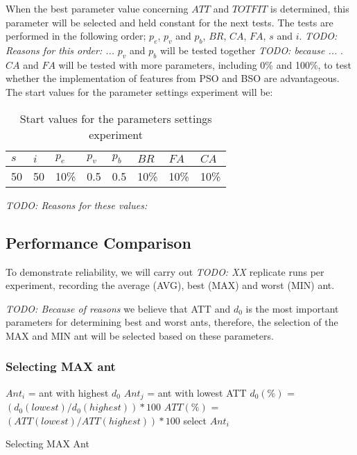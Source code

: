 When the best parameter value concerning $ATT$ and $TOTFIT$ is determined, this parameter will be selected and held constant for the next tests. The tests are performed in the following order; $p_{e}$, $p_{v}$ and $p_{b}$, $BR$, $CA$, $FA$, $s$ and $i$. \emph{\color{blue} TODO: Reasons for this order: ... }
$p_{v}$ and $p_{b}$ will be tested together \emph{\color{blue} TODO: because ... }.
$CA$ and $FA$ will be tested with more parameters, including 0\% and 100\%, to test whether the implementation of features from PSO and BSO are advantageous. The start values for the parameter settings experiment will be:

\begin{table}[H]
	\centering
    \begin{tabular}{|l|l|l|l|l|l|l|l|}
 	\hline
 	$s$ & $i$ & $p_{e}$ & $p_{v}$ & $p_{b}$ & $BR$  & $FA$ & $CA$  \\
 	\hline
    50 & 50 & 10\% & 0.5 & 0.5 & 10\% & 10\%  & 10\%  \\
	\hline
    \end{tabular}
    \caption {Start values for the parameters settings experiment} \emph{\color{blue} TODO: Reasons for these values:}
    \label{table:parameter_startvalues}
	\end{table}

\subsection{Performance Comparison}

To demonstrate reliability, we will carry out \emph{\color{blue} TODO: XX } replicate runs per experiment, recording the average (AVG), best (MAX) and worst (MIN) ant.  

\emph{\color{blue} TODO: Because of reasons }we believe that ATT and $d_0$ is the most important parameters for determining best and worst ants, therefore, the selection of the MAX and MIN ant will be selected based on these parameters. 

\subsubsection{Selecting MAX ant}
\begin{algorithm}[H]
$Ant_{i}$ = ant with highest $d_0$\;
$Ant_{j}$ = ant with lowest ATT\;
{
	$d_0(\%)$ = $(d_0(lowest) / d_0(highest))*100$\;
	$ATT(\%)$ = $(ATT(lowest) / ATT(highest))*100$\;
	{
		select $Ant_{i}$
	}
}
 \caption{Selecting MAX Ant}
\end{algorithm}


